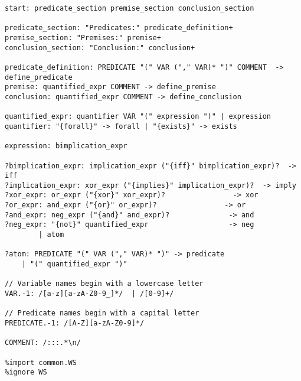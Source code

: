 
\begin{lstlisting}[style=myGrammarStyle, caption=Prover9 Grammar]
start: predicate_section premise_section conclusion_section

predicate_section: "Predicates:" predicate_definition+
premise_section: "Premises:" premise+
conclusion_section: "Conclusion:" conclusion+

predicate_definition: PREDICATE "(" VAR ("," VAR)* ")" COMMENT  -> define_predicate
premise: quantified_expr COMMENT -> define_premise
conclusion: quantified_expr COMMENT -> define_conclusion

quantified_expr: quantifier VAR "(" expression ")" | expression
quantifier: "{forall}" -> forall | "{exists}" -> exists

expression: bimplication_expr

?bimplication_expr: implication_expr ("{iff}" bimplication_expr)?  -> iff
?implication_expr: xor_expr ("{implies}" implication_expr)?  -> imply
?xor_expr: or_expr ("{xor}" xor_expr)?                -> xor
?or_expr: and_expr ("{or}" or_expr)?                -> or
?and_expr: neg_expr ("{and}" and_expr)?              -> and
?neg_expr: "{not}" quantified_expr                   -> neg 
        | atom

?atom: PREDICATE "(" VAR ("," VAR)* ")" -> predicate 
    | "(" quantified_expr ")" 

// Variable names begin with a lowercase letter
VAR.-1: /[a-z][a-zA-Z0-9_]*/  | /[0-9]+/

// Predicate names begin with a capital letter
PREDICATE.-1: /[A-Z][a-zA-Z0-9]*/

COMMENT: /:::.*\n/

%import common.WS
%ignore WS
\end{lstlisting}
\label{gram:prover9_grammar}